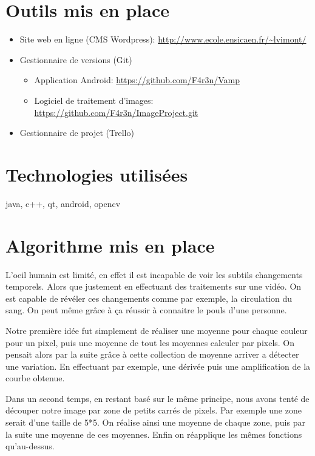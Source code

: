 \section{Outils mis en place}

\begin{itemize}
	\item Site web en ligne (CMS Wordpress): \url{http://www.ecole.ensicaen.fr/~lvimont/} 
	\item Gestionnaire de versions (Git) 
		\begin{itemize}[label=\textbullet]
			\item Application Android: \url{https://github.com/F4r3n/Vamp} 
			\item Logiciel de traitement d'images: \url{https://github.com/F4r3n/ImageProject.git} 
		\end{itemize}
	\item Gestionnaire de projet (Trello)
\end{itemize}

\section{Technologies utilisées}

java, c++, qt, android, opencv

\section{Algorithme mis en place}

L'oeil humain est limité, en effet il est incapable de voir les subtils changements temporels. Alors
que justement en effectuant des traitements sur une vidéo. On est capable de révéler ces changements
comme par exemple, la circulation du sang. On peut même grâce à ça réussir à connaitre le pouls d'une
personne. 

Notre première idée fut simplement de réaliser une moyenne pour chaque couleur pour un pixel, puis 
une moyenne de tout les moyennes calculer par pixels. On pensait alors par la suite grâce à cette 
collection de moyenne arriver a détecter une variation. En effectuant par exemple, une dérivée puis
une amplification de la courbe obtenue.  

Dans un second temps, en restant basé sur le même principe, nous avons tenté de découper notre image
par zone de petits carrés de pixels. Par exemple une zone serait d'une taille de 5*5. On réalise 
ainsi une moyenne de chaque zone, puis par la suite une moyenne de ces moyennes. Enfin on réapplique
les mêmes fonctions qu'au-dessus.

